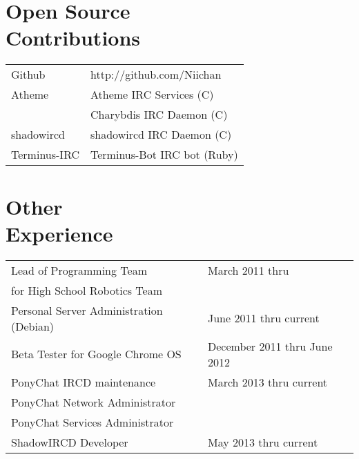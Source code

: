\documentclass[line, margin, 10pt]{res}
\begin{document}
\begin{resume}
\section{Open Source \\ Contributions}
\begin{tabular}{l l}
Github & http://github.com/Niichan \\ [5pt]
Atheme & Atheme IRC Services (C) \\ [5pt]
& Charybdis IRC Daemon (C) \\ [5pt]
shadowircd & shadowircd IRC Daemon (C) \\ [5pt]
Terminus-IRC & Terminus-Bot IRC bot (Ruby) \\ [5pt]
\end{tabular}

\section{Other \\ Experience}
\begin{tabular}{l l}
 Lead of Programming Team & March 2011 thru  \\ [5pt]
 for High School Robotics Team & \\ [10pt]
 Personal Server Administration (Debian) & June 2011 thru current  \\ [10pt]
 Beta Tester for Google Chrome OS & December 2011 thru June 2012 \\ [10pt]
 PonyChat IRCD maintenance & March 2013 thru current \\ [5pt]
 PonyChat Network Administrator & \\ [5pt]
 PonyChat Services Administrator & \\ [10pt]
 ShadowIRCD Developer & May 2013 thru current \\ [5pt]
\end{tabular}
     
\end{resume}
\end{document}
